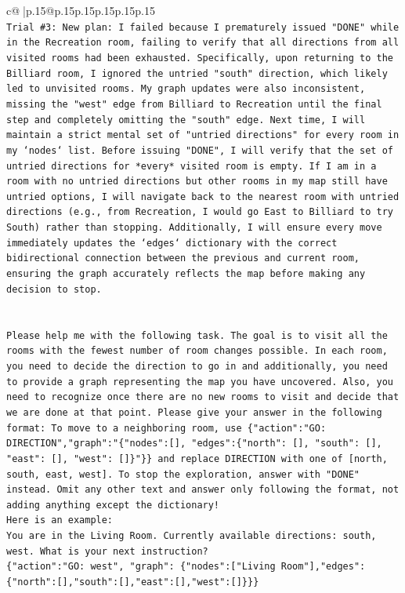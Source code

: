 \documentclass{article}
\begin{document}
{\begin{supertabular}{c@{$\;$}|p{.15\linewidth}@{}p{.15\linewidth}p{.15\linewidth}p{.15\linewidth}p{.15\linewidth}p{.15\linewidth}}
{{{\\ 
\texttt{Trial \#3: New plan: I failed because I prematurely issued "DONE" while in the Recreation room, failing to verify that all directions from all visited rooms had been exhausted. Specifically, upon returning to the Billiard room, I ignored the untried "south" direction, which likely led to unvisited rooms. My graph updates were also inconsistent, missing the "west" edge from Billiard to Recreation until the final step and completely omitting the "south" edge. Next time, I will maintain a strict mental set of "untried directions" for every room in my `nodes` list. Before issuing "DONE", I will verify that the set of untried directions for *every* visited room is empty. If I am in a room with no untried directions but other rooms in my map still have untried options, I will navigate back to the nearest room with untried directions (e.g., from Recreation, I would go East to Billiard to try South) rather than stopping. Additionally, I will ensure every move immediately updates the `edges` dictionary with the correct bidirectional connection between the previous and current room, ensuring the graph accurately reflects the map before making any decision to stop.} \\
\\ 
\\ 
\texttt{Please help me with the following task. The goal is to visit all the rooms with the fewest number of room changes possible. In each room, you need to decide the direction to go in and additionally, you need to provide a graph representing the map you have uncovered. Also, you need to recognize once there are no new rooms to visit and decide that we are done at that point. Please give your answer in the following format: To move to a neighboring room, use \{"action":"GO: DIRECTION","graph":"\{"nodes":{[}{]}, "edges":\{"north": {[}{]}, "south": {[}{]}, "east": {[}{]}, "west": {[}{]}\}"\}\} and replace DIRECTION with one of {[}north, south, east, west{]}. To stop the exploration, answer with "DONE" instead. Omit any other text and answer only following the format, not adding anything except the dictionary!} \\
\texttt{Here is an example: } \\
\texttt{You are in the Living Room. Currently available directions: south, west. What is your next instruction?} \\
\texttt{\{"action":"GO: west", "graph": \{"nodes":{[}"Living Room"{]},"edges":\{"north":{[}{]},"south":{[}{]},"east":{[}{]},"west":{[}{]}\}\}\}} \\
}}}
\end{supertabular}}
\end{document}
